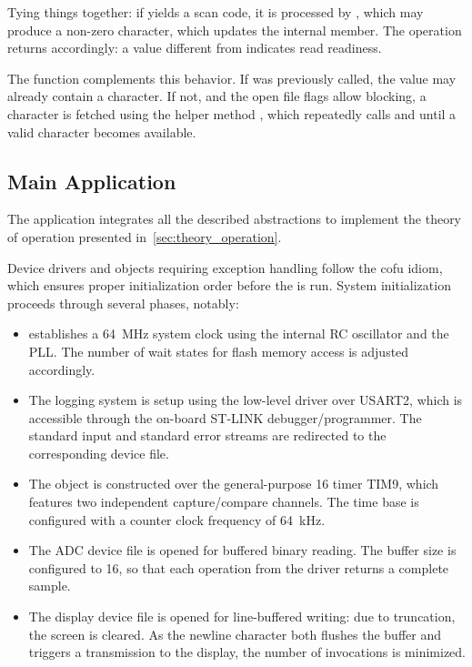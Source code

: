 Tying things together: if  yields a scan code, it is processed by , which may produce a non-zero character, which updates the internal  member. The  operation returns accordingly: a  value different from  indicates read readiness.

The  function complements this behavior. If  was previously called, the  value may already contain a character. If not, and the open file flags allow blocking, a character is fetched using the helper method , which repeatedly calls  and  until a valid character becomes available.

\subsection{Main Application}

The application integrates all the described abstractions to implement the theory of operation presented in~\cref{sec:theory_operation}.

Device drivers and objects requiring exception handling follow the \ac{cofu} idiom, which ensures proper initialization order before the  is run.
System initialization proceeds through several phases, notably:
\begin{itemize}
    \item {} establishes a \qty{64}{\mega\hertz} system clock using the internal RC oscillator and the PLL. The number of wait states for flash memory access is adjusted accordingly.

    \item The logging system is setup using the low-level driver  over USART2, which is accessible through the on-board ST-LINK debugger/programmer. The standard input and standard error streams are redirected to the corresponding device file.

    \item The  object is constructed over the general-purpose \qty{16}{\bit} timer TIM9, which features two independent capture/compare channels. The time base is configured with a counter clock frequency of \qty{64}{\kHz}.

    \item The ADC device file is opened for buffered binary reading. The buffer size is configured to \qty{16}{\bit}, so that each  operation from the driver returns a complete sample.

    \item The display device file is opened for line-buffered writing: due to truncation, the screen is cleared. As the newline character both flushes the buffer and triggers a transmission to the display, the number of  invocations is minimized.
\end{itemize}


